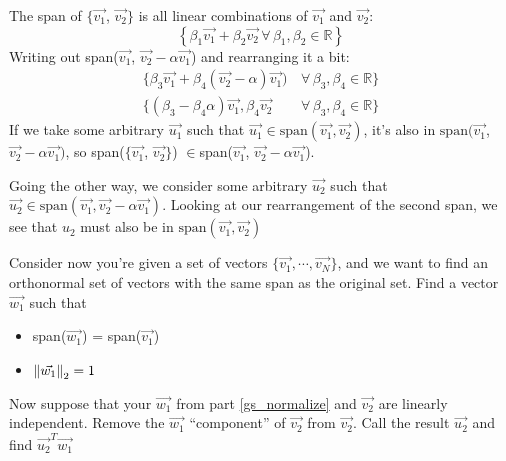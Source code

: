\begin{enumerate}
{    The span of $\{\vec{v_1}$, $\vec{v_2}\}$ is all linear combinations of $\vec{v_1}$ and $\vec{v_2}$:
    $$\left\{\beta_1 \vec{v_1} + \beta_2 \vec{v_2} \,\forall\, \beta_1, \beta_2\in\mathbb{R}\right\}$$
    Writing out span($\vec{v_1}$, $\vec{v_2}-\alpha \vec{v_1}$) and rearranging it a bit:
    \begin{align*}
        \{\beta_3\vec{v_1} + \beta_4(\vec{v_2}-\alpha)\vec{v_1})\,&\forall\, \beta_3, \beta_4\in\mathbb{R}\}\\
        \{(\beta_3-\beta_4\alpha)\vec{v_1}, \beta_4\vec{v_2}\,&\forall\, \beta_3, \beta_4\in\mathbb{R}\}
    \end{align*}
    If we take some arbitrary $\vec{u_1}$ such that $\vec{u_1}\in\text{span}(\vec{v_1}, \vec{v_2})$, it's also in $\text{span}(\vec{v_1}$, $\vec{v_2}-\alpha \vec{v_1})$, so span($\{\vec{v_1}$, $\vec{v_2}\}$) $\in $span($\vec{v_1}$, $\vec{v_2}-\alpha \vec{v_1}$).

    Going the other way, we consider some arbitrary $\vec{u_2}$ such that $\vec{u_2}\in\text{span}(\vec{v_1}, \vec{v_2}-\alpha \vec{v_1})$. Looking at our rearrangement of the second span, we see that $u_2$ must also be in $\text{span}(\vec{v_1}, \vec{v_2})$}

\empt{\vspace{1.5cm}}

\qitem\label{gs_normalize}{
    Consider now you're given a set of vectors $\{\vec{v_1}, \cdots ,\vec{v_N}\}$, and we want to find an orthonormal set of vectors with the same span as the original set. Find a vector $\vec{w_1}$ such that
    \begin{itemize}
        \item span($\vec{w_1}$) = span($\vec{v_1}$)
        \item $\left\lVert\vec{w_1}\right\rVert_2 = 1$
    \end{itemize}}



\empt{\vspace{2.5cm}}

\qitem\label{gs_project_indep}{
    Now suppose that your $\vec{w_1}$ from part \ref{gs_normalize} and $\vec{v_2}$ are linearly independent. Remove the $\vec{w_1}$ ``component'' of $\vec{v_2}$ from $\vec{v_2}$. Call the result $\vec{u_2}$ and find $\vec{u_2}^T\vec{w_1}$}


\end{enumerate}
